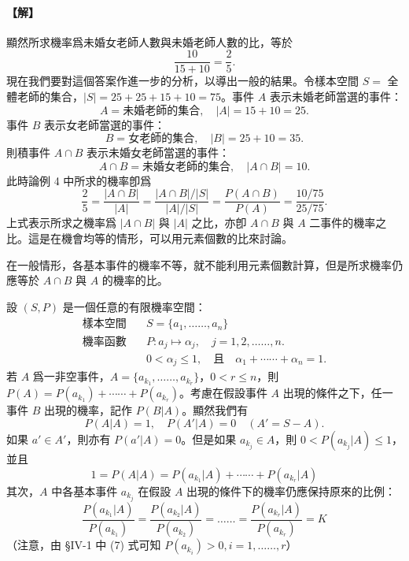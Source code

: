 \paragraph{【解】}
顯然所求機率爲未婚女老師人數與未婚老師人數的比，等於
\[
\frac{10}{15+10} = \frac{2}{5}.
\]
現在我們要對這個答案作進一步的分析，以導出一般的結果。令樣本空間 $S=$ 全體老師的集合，$|S|=25+25+15+10=75$。事件 $A$ 表示未婚老師當選的事件：
\[
A = \text{未婚老師的集合}, \quad |A| = 15+10 = 25.
\]
事件 $B$ 表示女老師當選的事件：
\[
B = \text{女老師的集合}, \quad |B| = 25+10 = 35.
\]
則積事件 $A \cap B$ 表示未婚女老師當選的事件：
\[
A \cap B = \text{未婚女老師的集合}, \quad |A \cap B| = 10.
\]
此時論例 4 中所求的機率卽爲
\[
\frac{2}{5} = \frac{|A \cap B|}{|A|} = \frac{|A \cap B|/|S|}{|A|/|S|} = \frac{P(A \cap B)}{P(A)} = \frac{10/75}{25/75}.
\]
上式表示所求之機率爲 $|A \cap B|$ 與 $|A|$ 之比，亦卽 $A \cap B$ 與 $A$ 二事件的機率之比。這是在機會均等的情形，可以用元素個數的比來討論。

在一般情形，各基本事件的機率不等，就不能利用元素個數計算，但是所求機率仍應等於 $A \cap B$ 與 $A$ 的機率的比。

設 $(S, P)$ 是一個任意的有限機率空間：
\begin{align*}
\text{樣本空間}\quad & S = \{a_1, \dots\dots, a_n\} \\
\text{機率函數}\quad & P : a_j \longmapsto \alpha_j, \quad j = 1, 2, \dots\dots, n. \\
& 0 < \alpha_j \le 1, \quad\text{且}\quad \alpha_1 + \cdots\cdots + \alpha_n = 1.
\end{align*}
若 $A$ 爲一非空事件，$A=\{a_{k_1}, \dots\dots, a_{k_r}\}$，$0 < r \le n$，則 $P(A) = P(a_{k_1}) + \cdots\cdots + P(a_{k_r})$。考慮在假設事件 $A$ 出現的條件之下，任一事件 $B$ 出現的機率，記作 $P(B|A)$。顯然我們有
\[
P(A|A) = 1, \quad P(A'|A) = 0 \quad (A' = S - A).
\]
如果 $a' \in A'$，則亦有 $P(a'|A) = 0$。但是如果 $a_{k_j} \in A$，則 $0 < P(a_{k_j}|A) \le 1$，並且
\begin{equation}\tag{1}\label{eq:b5-4-1}
1 = P(A|A) = P(a_{k_1}|A) + \cdots\cdots + P(a_{k_r}|A)
\end{equation}
其次，$A$ 中各基本事件 $a_{k_j}$ 在假設 $A$ 出現的條件下的機率仍應保持原來的比例：
\begin{equation}\tag{2}\label{eq:b5-4-2}
\frac{P(a_{k_1}|A)}{P(a_{k_1})} = \frac{P(a_{k_2}|A)}{P(a_{k_2})} = \dots\dots = \frac{P(a_{k_r}|A)}{P(a_{k_r})} = K
\end{equation}
（注意，由 §IV-1 中 (7) 式可知 $P(a_{k_i}) > 0, i = 1, \dots\dots, r$）

